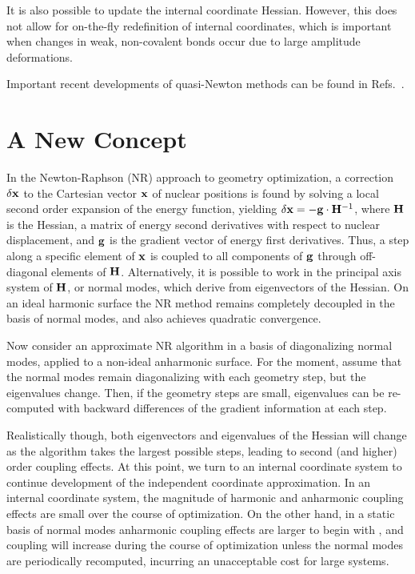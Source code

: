 \documentclass[prl,twocolumn,showpacs,twocolumngrid,superbib]{revtex4}
\begin{document}
It is also possible to update the internal coordinate Hessian. However, this does not allow for 
on-the-fly redefinition of internal coordinates, which is important when  changes in weak, non-covalent 
bonds occur due to large amplitude deformations.

Important recent developments of quasi-Newton methods can be found in
Refs.~.

\section{A New Concept} \label{concept}

In the Newton-Raphson (NR) approach to geometry optimization, a correction $\delta {\bf x}$  to the 
Cartesian vector $\bf x$ of nuclear positions is found by solving a local second order expansion of the 
energy function, yielding  $\delta {\bf x}  = - {\bf g}\cdot {\bf H}^{-1}$,  where $\bf H$ 
is the Hessian, a matrix of energy second derivatives with respect to nuclear displacement,
and $\bf g$ is the gradient vector of energy first derivatives.  Thus, 
a step along a specific element of $\bf x$ is coupled to all components of $\bf g$ through off-diagonal 
elements of $\bf H$.  Alternatively, it is possible to work in the principal axis system of $\bf H$, or 
normal modes,  which derive from eigenvectors of the Hessian.  On an ideal harmonic surface the NR method remains 
completely decoupled 
in the basis of normal modes, and also achieves quadratic convergence.  

Now consider an approximate NR algorithm in a basis of diagonalizing normal modes,  applied to a 
non-ideal anharmonic surface.  For the moment,  assume that the normal modes remain diagonalizing with each
geometry step, but the eigenvalues change.  Then, if the geometry steps are small,
eigenvalues can be re-computed with backward differences of the gradient information at each step. 

Realistically though, both eigenvectors and eigenvalues of the Hessian will change as the 
algorithm takes the largest possible steps, leading to second (and higher) order coupling effects.  At this point, 
we turn to an internal coordinate system to continue development of the independent coordinate 
approximation.  In an internal coordinate system, the magnitude of harmonic and anharmonic coupling
effects are small over the course of optimization.  On the other hand,
in a static basis of normal modes anharmonic coupling effects are larger to begin with \cite{GFogarasi79}, 
and coupling will increase during the course of optimization unless the normal modes are 
periodically recomputed, incurring an unacceptable cost for large systems.  
\end{document}
